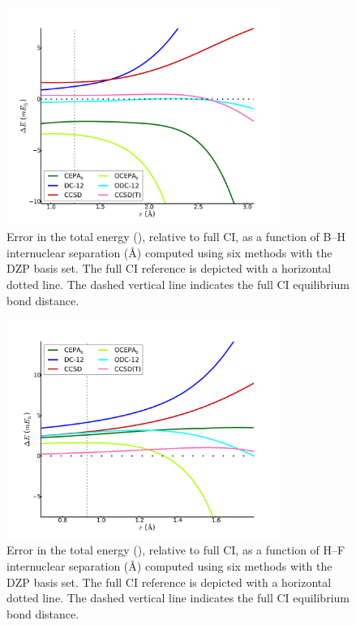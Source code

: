 \begin{figure}
	\centering
	\caption{%
        \label{bh-f}
        Error in the total energy (\mhartree), relative to full CI, as a
        function of B--H internuclear separation (\AA) computed using six
        methods with the DZP basis set.
        The full CI reference is depicted with a horizontal dotted line.
        The dashed vertical line indicates the full CI equilibrium bond
        distance.
	}
	\includegraphics[width=0.8\textwidth]{figures/bh.pdf}
\end{figure}

\begin{figure}
	\centering
	\caption{%
        \label{hf-f}
        Error in the total energy (\mhartree), relative to full CI, as a
        function of H--F internuclear separation (\AA) computed using six
        methods with the DZP basis set.
        The full CI reference is depicted with a horizontal dotted line.
        The dashed vertical line indicates the full CI equilibrium bond
        distance.
	}
	\includegraphics[width=0.8\textwidth]{figures/hf.pdf}
\end{figure}

